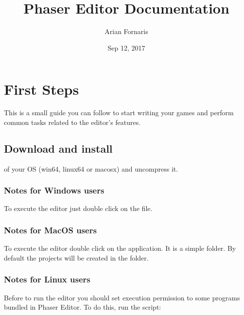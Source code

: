 \documentclass[letterpaper,10pt,english]{sphinxmanual}
\title{Phaser Editor Documentation}
\date{Sep 12, 2017}
\author{Arian Fornaris}
\begin{document}
\maketitle
\sphinxtableofcontents
{}\label{\detokenize{index::doc}}



\chapter{First Steps}
\label{\detokenize{first_steps:first-steps}}\label{\detokenize{first_steps::doc}}\label{\detokenize{first_steps:welcome-to-phaser-editor-s-documentation}}
This is a small guide you can follow to start writing your games and perform common tasks related to the editor’s features.


\section{Download and install}
\label{\detokenize{first_steps:download-and-install}}
 of your OS (win64, linux64 or macosx) and uncompress it.


\subsection{Notes for Windows users}
\label{\detokenize{first_steps:notes-for-windows-users}}
To execute the editor just double click on the  file.


\subsection{Notes for MacOS users}
\label{\detokenize{first_steps:notes-for-macos-users}}
To execute the editor double click on the  application. It is a simple  folder. By default the projects will be created in the  folder.


\subsection{Notes for Linux users}
\label{\detokenize{first_steps:notes-for-linux-users}}
Before to run the editor you should set execution permission to some programs bundled in Phaser Editor. To do this, run the  script:
\end{document}
